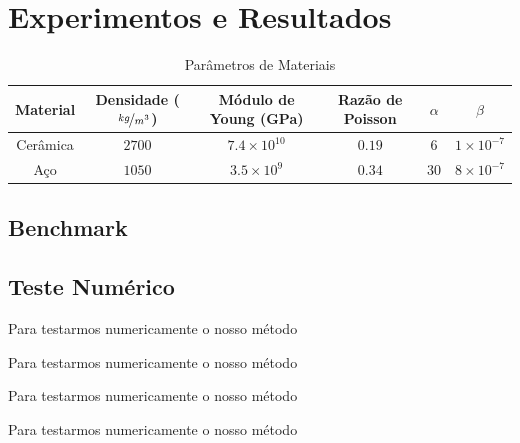 \chapter{Experimentos e Resultados}

\begin{table}[ht]
\begin{center}
\begin{tabular}{c|ccccc}
Material & Densidade ($\nicefrac{kg}{m^3}$) & Módulo de Young (GPa) & Razão de Poisson & $\alpha$ & $\beta$\\
\hline Cerâmica & $2700$ & $7.4 \times 10^{10}$ & $0.19$ & $6$ & $1 \times 10^{-7}$\\
Aço & $1050$ & $3.5 \times 10^9$ & $0.34$ & $30$ & $8 \times 10^{-7}$\\
\end{tabular}
\end{center}
\caption{Parâmetros de Materiais}\label{tab:material_parameters}
\end{table}

\section{Benchmark}
\section{Teste Numérico}

Para testarmos numericamente o nosso método

Para testarmos numericamente o nosso método

Para testarmos numericamente o nosso método

Para testarmos numericamente o nosso método

